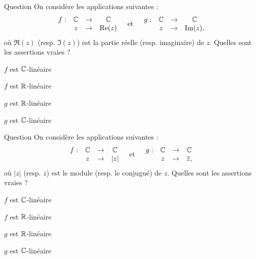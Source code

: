 \begin{multi}[multiple,feedback=
{On vérifie que \(f\) et \(g\) sont \(\Rr\)-linéaires. Par contre, elles ne sont pas \(\Cc\)-linéaires.
}]{Question}
On considère les applications suivantes : 
\[\begin{array}{rccc}f:&\mathbb{C}&\to&\mathbb{C}\\
& z&\to& \mathop{\mathrm{Re}}\nolimits (z)\end{array}   \quad \mbox{et} \quad  \begin{array}{rccc}g:&\mathbb{C}&\to&\mathbb{C}\\
& z&\to& \mathop{\mathrm{Im}}\nolimits (z), \end{array}\]
où \(\Re (z)\) (resp. \(\Im (z)\)) est la partie réelle (resp. imaginaire) de \(z\). Quelles sont les assertions vraies ?

    \item \(f\) est \(\Cc\)-linéaire
    \item* \(f\) est \(\Rr\)-linéaire
    \item* \(g\) est  \(\Rr\)-linéaire
    \item \(g\) est \(\Cc\)-linéaire
\end{multi}


\begin{multi}[multiple,feedback=
{On vérifie que \(f\) n'est pas \(\Rr\)-linéaire (donc n'est pas \(\Cc\)-linéaire) et que \(g\) est \(\Rr\)-linéaire, mais non \(\Cc\)-linéaire.
}]{Question}
On considère les applications suivantes : 
\[\begin{array}{rccc}f:&\mathbb{C}&\to&\mathbb{C}\\
& z&\to& |z|\end{array}  \quad \mbox{et} \quad \begin{array}{rccc}g:&\mathbb{C}&\to&\mathbb{C}\\
& z&\to& \overline{z},
\end{array} \]
où \(|z|\) (resp. \(\overline{z}\)) est le module (resp. le conjugué) de \(z\). Quelles sont les assertions vraies ?

    \item \(f\) est \(\Cc\)-linéaire
    \item \(f\) est \(\Rr\)-linéaire
    \item* \(g\) est \(\Rr\)-linéaire
    \item \(g\) est \(\Cc\)-linéaire
\end{multi}



